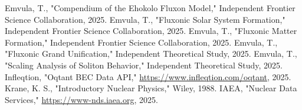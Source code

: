 \documentclass[11pt]{article}
\begin{document}



\begin{thebibliography}{9}
Emvula, T., "Compendium of the Ehokolo Fluxon Model," Independent Frontier Science Collaboration, 2025.
Emvula, T., "Fluxonic Solar System Formation," Independent Frontier Science Collaboration, 2025.
Emvula, T., "Fluxonic Matter Formation," Independent Frontier Science Collaboration, 2025.
Emvula, T., "Fluxonic Grand Unification," Independent Theoretical Study, 2025.
Emvula, T., "Scaling Analysis of Soliton Behavior," Independent Theoretical Study, 2025.
Infleqtion, "Oqtant BEC Data API," \url{https://www.infleqtion.com/oqtant}, 2025.
Krane, K. S., "Introductory Nuclear Physics," Wiley, 1988.
IAEA, "Nuclear Data Services," \url{https://www-nds.iaea.org}, 2025.
\end{thebibliography}
\end{document}
